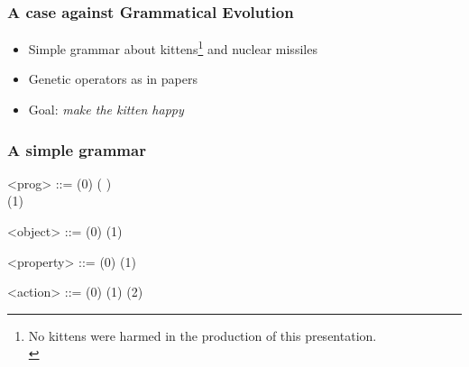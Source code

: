 \documentclass{beamer}
\begin{document}
\begin{frame}
\frametitle{A case against Grammatical Evolution}
\begin{itemize}
\item Simple grammar about kittens\footnote{No kittens were harmed in the production of this presentation.\\} and nuclear missiles
\item Genetic operators as in papers
\item Goal: \textit{make the kitten happy}
\end{itemize}
\end{frame}

\begin{frame}
\frametitle{A simple grammar}
\begin{grammar}
<prog>     ::=   \hfill (0) \hspace{1em}
            \alt {} \lit*(  \lit*)
              \\\lit*{\{}  \lit*{\}} \hfill (1) \hspace{1em}

<object>   ::=  \hfill (0) \hspace{1em}
            \alt {} \hfill (1) \hspace{1em}

<property> ::=  \hfill (0) \hspace{1em}
            \alt {} \hfill (1) \hspace{1em}

<action>   ::=  \hfill (0) \hspace{1em}
            \alt {} \hfill (1) \hspace{1em}
            \alt {} \hfill (2) \hspace{1em} \par
\end{grammar}
\end{frame}
\end{document}

